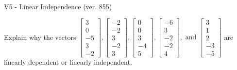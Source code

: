 \begin{exercise}
  \begin{exerciseTitle}V5 - Linear Independence (ver. 855)\end{exerciseTitle}
  \begin{exerciseStatement}
    Explain why the vectors \(\left[\begin{array}{r}
3 \\
0 \\
-5 \\
3 \\
-2
\end{array}\right] , \left[\begin{array}{r}
-2 \\
-2 \\
3 \\
-2 \\
3
\end{array}\right] , \left[\begin{array}{r}
0 \\
0 \\
3 \\
-4 \\
5
\end{array}\right] , \left[\begin{array}{r}
-6 \\
3 \\
-2 \\
-2 \\
4
\end{array}\right] , \text{ and } \left[\begin{array}{r}
3 \\
1 \\
2 \\
-3 \\
-5
\end{array}\right]\) are linearly dependent or linearly independent.	



\end{exerciseStatement}
\end{exercise}
